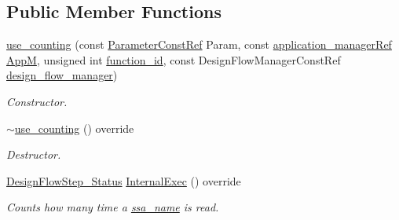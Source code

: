 \subsection*{Public Member Functions}
\begin{DoxyCompactItemize}
\item 
\hyperlink{classuse__counting_aa642d9fb1069098c5d783426503562cc}{use\+\_\+counting} (const \hyperlink{Parameter_8hpp_a37841774a6fcb479b597fdf8955eb4ea}{Parameter\+Const\+Ref} Param, const \hyperlink{application__manager_8hpp_a04ccad4e5ee401e8934306672082c180}{application\+\_\+manager\+Ref} \hyperlink{classFrontendFlowStep_a0ac0d8db2a378416583f51c4faa59d15}{AppM}, unsigned int \hyperlink{classFunctionFrontendFlowStep_a58ef2383ad1a212a8d3f396625a4b616}{function\+\_\+id}, const Design\+Flow\+Manager\+Const\+Ref \hyperlink{classDesignFlowStep_ab770677ddf087613add30024e16a5554}{design\+\_\+flow\+\_\+manager})
\begin{DoxyCompactList}\small\item\em Constructor. \end{DoxyCompactList}\item 
\hyperlink{classuse__counting_a90fc0f0d8a9821ee13e8a2fec93e2949}{$\sim$use\+\_\+counting} () override
\begin{DoxyCompactList}\small\item\em Destructor. \end{DoxyCompactList}\item 
\hyperlink{design__flow__step_8hpp_afb1f0d73069c26076b8d31dbc8ebecdf}{Design\+Flow\+Step\+\_\+\+Status} \hyperlink{classuse__counting_ae475b6f0db3a817a4a1b90ba6ffb2a6d}{Internal\+Exec} () override
\begin{DoxyCompactList}\small\item\em Counts how many time a \hyperlink{structssa__name}{ssa\+\_\+name} is read. \end{DoxyCompactList}\end{DoxyCompactItemize}
